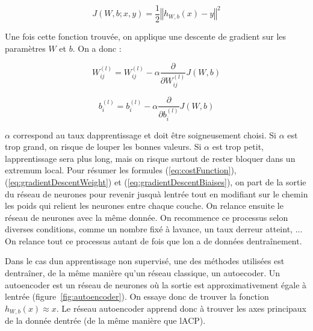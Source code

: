 \documentclass[11pt,final,ENIB]{sdm}
\begin{document}
			\begin{equation}
				J(W,b;x,y) = \frac{1}{2} {\left\Vert h_{W,b}(x) - y \right\Vert}^2
				\label{eq:costFunction}
			\end{equation}

			Une fois cette fonction trouv\'ee, on applique une descente de gradient sur les param\`etres $W$ et $b$. On a donc :

			\begin{equation}
				W_{ij}^{(l)} = W_{ij}^{(l)} - \alpha \frac{\partial}{\partial W_{ij}^{(l)}} J(W,b)
				\label{eq:gradientDescentWeight}
			\end{equation}
 
			\begin{equation}
				b_{i}^{(l)} = b_{i}^{(l)} - \alpha \frac{\partial}{\partial b_{i}^{(l)}} J(W,b)
				\label{eq:gradientDescentBiaises}
			\end{equation}

			$\alpha$ correspond au taux d\textquotesingle apprentissage et doit \^etre soigneusement choisi. Si $\alpha$ est trop grand, on risque de louper les bonnes valeurs. Si $\alpha$ est trop petit, l\textquotesingle apprentissage sera plus long, mais on risque surtout de rester bloquer dans un extremum local. Pour r\'esumer les formules (\ref{eq:costFunction}), (\ref{eq:gradientDescentWeight}) et (\ref{eq:gradientDescentBiaises}), on part de la sortie du r\'eseau de neurones pour revenir jusqu\textquotesingle \`a l\textquotesingle entr\'ee tout en modifiant sur le chemin les poids qui relient les neurones entre chaque couche. On relance ensuite le r\'eseau de neurones avec la m\^eme donn\'ee.
			On recommence ce processus selon diverses conditions, comme un nombre fix\'e \`a l\textquotesingle avance, un taux d\textquotesingle erreur atteint, ...
			On relance tout ce processus autant de fois que l\textquotesingle on a de donn\'ees d\textquotesingle entra\^inement.

			Dans le cas d\textquotesingle un apprentissage non supervis\'e, une des m\'ethodes utilis\'ees est d\textquotesingle entra\^iner, de la m\^eme mani\`ere qu'un r\'eseau classique, un autoecoder. Un autoencoder est un r\'eseau de neurones o\`u la sortie est approximativement \'egale \`a l\textquotesingle entr\'ee (figure~\ref{fig:autoencoder}). On essaye donc de trouver la fonction $h_{W,b}(x) \approx x$. Le r\'eseau autoencoder apprend donc \`a trouver les axes principaux de la donn\'ee d\textquotesingle entr\'ee \cite{hinton2006reducing} (de la m\^eme mani\`ere que l\textquotesingle ACP).
\end{document}
